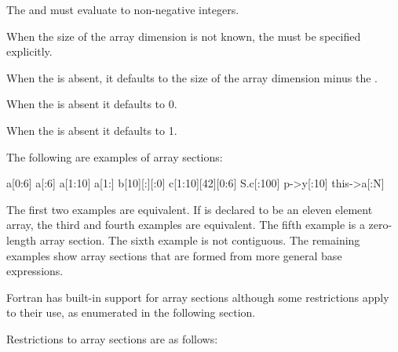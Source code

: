 \begin{ccppspecific}
The  and  must evaluate to non-negative integers.

When the size of the array dimension is not known, the  must be specified
explicitly.

When the  is absent, it defaults to the size of the array dimension minus the
.

When the  is absent it defaults to 0.

When the  is absent it defaults to 1.


\begin{note}
The following are examples of array sections:

\begin{indentedcodelist}
a[0:6]
a[:6]
a[1:10]
a[1:]
b[10][:][:0]
c[1:10][42][0:6]
S.c[:100]
p->y[:10]
this->a[:N]
\end{indentedcodelist}

The first two examples are equivalent. If  is declared to be an eleven
element array, the third and fourth examples are equivalent. The fifth example
is a zero-length array section. The sixth example is not contiguous.  The
remaining examples show array sections that are formed from more general base
expressions.
\end{note}
\medskip
\end{ccppspecific}

\begin{fortranspecific}
Fortran has built-in support for array sections although some
restrictions apply to their use, as enumerated in the following section.
\end{fortranspecific}

\restrictions
Restrictions to array sections are as follows:

